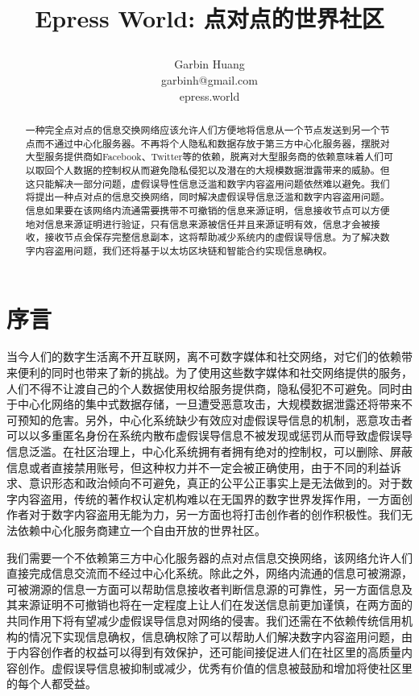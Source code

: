 \documentclass[12pt,a4paper]{extarticle}
\title{ \begin{huge}
\textbf{Epress World: 点对点的世界社区} 
\end{huge} }
\author{ Garbin Huang \\ garbinh@gmail.com \\ epress.world }
\begin{document}
\maketitle
\begin{abstract}
    一种完全点对点的信息交换网络应该允许人们方便地将信息从一个节点发送到另一个节点而不通过中心化服务器。不再将个人隐私和数据存放于第三方中心化服务器，摆脱对大型服务提供商如Facebook、Twitter等的依赖，脱离对大型服务商的依赖意味着人们可以取回个人数据的控制权从而避免隐私侵犯以及潜在的大规模数据泄露带来的威胁。但这只能解决一部分问题，虚假误导性信息泛滥和数字内容盗用问题依然难以避免。我们将提出一种点对点的信息交换网络，同时解决虚假误导信息泛滥和数字内容盗用问题。信息如果要在该网络内流通需要携带不可撤销的信息来源证明，信息接收节点可以方便地对信息来源证明进行验证，只有信息来源被信任并且来源证明有效，信息才会被接收，接收节点会保存完整信息副本，这将帮助减少系统内的虚假误导信息。为了解决数字内容盗用问题，我们还将基于以太坊区块链和智能合约实现信息确权。
\end{abstract}
\section{序言}\label{introduction}
    当今人们的数字生活离不开互联网，离不可数字媒体和社交网络，对它们的依赖带来便利的同时也带来了新的挑战。为了使用这些数字媒体和社交网络提供的服务，人们不得不让渡自己的个人数据使用权给服务提供商\cite{twitter_tos}\cite{facebook_tos}，隐私侵犯不可避免。同时由于中心化网络的集中式数据存储，一旦遭受恶意攻击，大规模数据泄露还将带来不可预知的危害。另外，中心化系统缺少有效应对虚假误导信息的机制\cite{twitter_fakenews}\cite{fb_fakenews}，恶意攻击者可以以多重匿名身份在系统内散布虚假误导信息不被发现或惩罚从而导致虚假误导信息泛滥。在社区治理上，中心化系统拥有者拥有绝对的控制权，可以删除、屏蔽信息或者直接禁用账号，但这种权力并不一定会被正确使用，由于不同的利益诉求、意识形态和政治倾向不可避免，真正的公平公正事实上是无法做到的。对于数字内容盗用，传统的著作权认定机构难以在无国界的数字世界发挥作用，一方面创作者对于数字内容盗用无能为力，另一方面也将打击创作者的创作积极性。我们无法依赖中心化服务商建立一个自由开放的世界社区。

    我们需要一个不依赖第三方中心化服务器的点对点信息交换网络，该网络允许人们直接完成信息交流而不经过中心化系统。除此之外，网络内流通的信息可被溯源，可被溯源的信息一方面可以帮助信息接收者判断信息源的可靠性，另一方面信息及其来源证明不可撤销也将在一定程度上让人们在发送信息前更加谨慎，在两方面的共同作用下将有望减少虚假误导信息对网络的侵害。我们还需在不依赖传统信用机构的情况下实现信息确权，信息确权除了可以帮助人们解决数字内容盗用问题，由于内容创作者的权益可以得到有效保护，还可能间接促进人们在社区里的高质量内容创作。虚假误导信息被抑制或减少，优秀有价值的信息被鼓励和增加将使社区里的每个人都受益。
    
\end{document}
